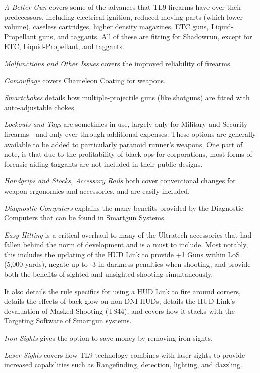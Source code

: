 \begin{multicols*}{2}
	\textit{A Better Gun} covers some of the advances that TL9 firearms have over their predecessors, including electrical ignition, reduced moving parts (which lower volume), caseless cartridges, higher density magazines, ETC guns, Liquid-Propellant guns, and taggants. All of these are fitting for Shadowrun, except for ETC, Liquid-Propellant, and taggants.
	
	\textit{Malfunctions and Other Issues} covers the improved reliability of firearms.
	
	\textit{Camouflage} covers Chameleon Coating for weapons.
	
	\textit{Smartchokes} details how multiple-projectile guns (like shotguns) are fitted with auto-adjustable chokes.
	
	\textit{Lockouts and Tags} are sometimes in use, largely only for Military and Security firearms - and only ever through additional expenses. These options are generally available to be added to particularly paranoid runner's weapons. One part of note, is that due to the profitability of black ops for corporations, most forms of forensic aiding taggants are not included in their public designs.
	
	\textit{Handgrips and Stocks, Accessory Rails} both cover conventional changes for weapon ergonomics and accessories, and are easily included.
	
	\textit{Diagnostic Computers} explains the many benefits provided by the Diagnostic Computers that can be found in Smartgun Systems.
	
	\textit{Easy Hitting} is a critical overhaul to many of the Ultratech accessories that had fallen behind the norm of development and is a must to include. Most notably, this includes the updating of the HUD Link to provide +1 Guns within LoS (5,000 yards), negate up to -3 in darkness penalties when shooting, and provide both the benefits of sighted and unsighted shooting simultaneously. 
	
	It also details the rule specifics for using a HUD Link to fire around corners, details the effects of back glow on non DNI HUDs, details the HUD Link's devaluation of Masked Shooting (TS44), and covers how it stacks with the Targeting Software of Smartgun systems.
	
	\textit{Iron Sights} gives the option to save money by removing iron sights.
	
	\textit{Laser Sights} covers how TL9 technology combines with laser sights to provide increased capabilities such as Rangefinding, detection, lighting, and dazzling.
	

\end{multicols*}
